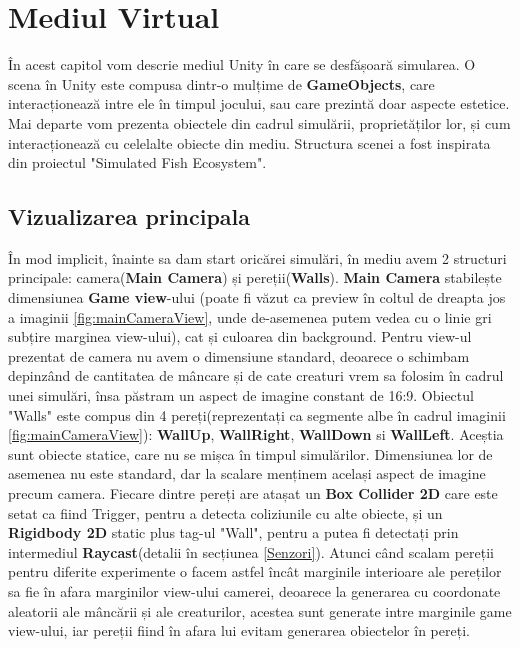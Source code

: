 \chapter{Mediul Virtual}\label{MediulVirtual}
În acest capitol vom descrie mediul Unity în care se desfășoară simularea.
O scena în Unity este compusa dintr-o mulțime de \textbf{GameObjects}, care interacționează intre ele în timpul jocului, sau care prezintă doar aspecte estetice.
Mai departe vom prezenta obiectele din cadrul simulării, proprietăților lor, și cum interacționează cu celelalte obiecte din mediu.
Structura scenei a fost inspirata din proiectul "Simulated Fish Ecosystem"\cite*{ZolphiteNeatYoutube}.

\section{Vizualizarea principala}
În mod implicit, înainte sa dam start oricărei simulări, în mediu avem 2 structuri principale: camera(\textbf{Main Camera}) și pereții(\textbf{Walls}).
\textbf{Main Camera} stabilește dimensiunea \textbf{Game view}-ului (poate fi văzut ca preview în coltul de dreapta jos a  imaginii \ref{fig:mainCameraView}, unde de-asemenea putem vedea cu o linie gri subțire marginea view-ului), cat și culoarea din background.
Pentru view-ul prezentat de camera nu avem o dimensiune standard, deoarece o schimbam depinzând de cantitatea de mâncare și de cate creaturi vrem sa folosim în cadrul unei simulări, însa păstram un aspect de imagine constant de 16:9.
Obiectul "Walls" este compus din 4 pereți(reprezentați ca segmente albe în cadrul imaginii \ref{fig:mainCameraView}): \textbf{WallUp}, \textbf{WallRight}, \textbf{WallDown} si \textbf{WallLeft}.
Aceștia sunt obiecte statice, care nu se mișca în timpul simulărilor.
Dimensiunea lor de asemenea nu este standard, dar la scalare menținem același aspect de imagine precum camera.
Fiecare dintre pereți are atașat un \textbf{Box Collider 2D} care este setat ca fiind Trigger, pentru a detecta coliziunile cu alte obiecte, și un \textbf{Rigidbody 2D} static plus tag-ul "Wall", pentru a putea fi detectați prin intermediul \textbf{Raycast}(detalii în secțiunea \ref{Senzori}).
Atunci când scalam pereții pentru diferite experimente o facem astfel încât marginile interioare ale pereților sa fie în afara marginilor view-ului camerei, deoarece la generarea cu coordonate aleatorii ale mâncării și ale creaturilor, acestea sunt generate intre marginile game view-ului, iar pereții fiind în afara lui evitam generarea obiectelor în pereți.

